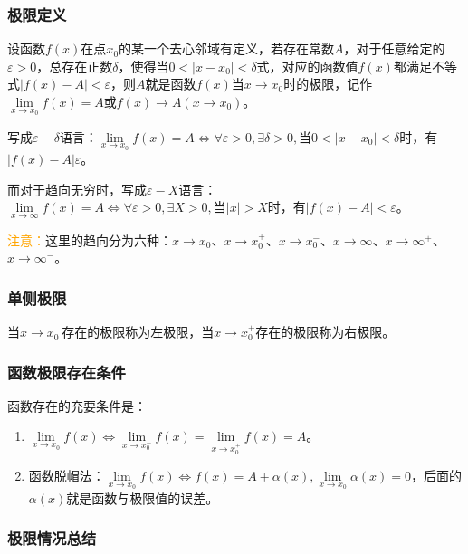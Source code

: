 \documentclass[UTF8, 12pt]{ctexart}
\begin{document}
    \subsubsection{极限定义}

    设函数$f(x)$在点$x_0$的某一个去心邻域有定义，若存在常数$A$，对于任意给定的$\varepsilon>0$，总存在正数$\delta$，使得当$0<\vert x-x_0\vert<\delta$式，对应的函数值$f(x)$都满足不等式$\vert f(x)-A\vert <\varepsilon$，则$A$就是函数$f(x)$当$x\to x_0$时的极限，记作$\lim\limits_{x\to x_0}f(x)=A$或$f(x)\rightarrow A(x\rightarrow x_0)$。

    写成$\varepsilon-\delta$语言：$\lim\limits_{x\to x_0}f(x)=A\Leftrightarrow\forall\varepsilon>0,\exists\delta>0,\text{当}0<\vert x-x_0\vert<\delta$时，有$\vert f(x)-A\vert\varepsilon$。

    而对于趋向无穷时，写成$\varepsilon-X$语言：$\lim\limits_{x\to\infty}f(x)=A\Leftrightarrow\forall\varepsilon>0,\exists X>0,\text{当}\vert x\vert>X$时，有$\vert f(x)-A\vert<\varepsilon$。

    \textcolor{orange}{注意：}这里的趋向分为六种：$x\to x_0$、$x\to x_0^+$、$x\to x_0^-$、$x\to\infty$、$x\to\infty^+$、$x\to\infty^-$。

    \subsubsection{单侧极限}

    当$x\to x_0^-$存在的极限称为左极限，当$x\to x_0^+$存在的极限称为右极限。

    \subsubsection{函数极限存在条件}

    函数存在的充要条件是：

    \begin{enumerate}
        \item $\lim\limits_{x\to x_0}f(x)\Leftrightarrow\lim\limits_{x\to x_0^-}f(x)=\lim\limits_{x\to x_0^+}f(x)=A$。
        \item 函数脱帽法：$\lim\limits_{x\to x_0}f(x)\Leftrightarrow f(x)=A+\alpha(x),\lim\limits_{x\to x_0}\alpha(x)=0$，后面的$\alpha(x)$就是函数与极限值的误差。
    \end{enumerate}

    \subsubsection{极限情况总结}
\end{document}
